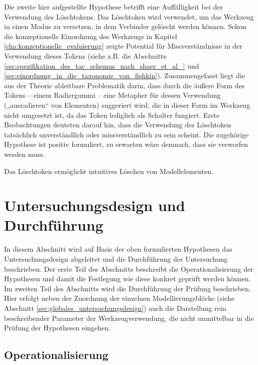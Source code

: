 Die zweite hier aufgestellte Hypothese betrifft eine Auffälligkeit bei der Verwendung des Löschtokens. Das Löschtoken wird verwendet, um das Werkzeug in einen Modus zu versetzen, in dem Verbinder gelöscht werden können. Schon die konzeptionelle Einordnung des Werkzeugs in Kapitel \ref{cha:konzeptionelle_evaluierung} zeigte Potential für Missverständnisse in der Verwendung dieses Tokens (siehe z.B. die Abschnitte \ref{sec:spezifikation_des_tac_schemas_nach_shaer_et_al_} und \ref{sec:einordnung_in_die_taxonomie_von_fishkin}). Zusammengefasst liegt die aus der Theorie ableitbare Problematik darin, dass durch die äußere Form des Tokens -- einem Radiergummi -- eine Metapher für dessen Verwendung („ausradieren“ von Elementen) suggeriert wird, die in dieser Form im Werkzeug nicht umgesetzt ist, da das Token lediglich als Schalter fungiert. Erste Beobachtungen deuteten darauf hin, dass die Verwendung des Löschtoken tatsächlich unverständlich oder missverständlich zu sein scheint. Die zugehörige Hypothese ist positiv formuliert, zu erwarten wäre demnach, dass sie verworfen werden muss.

\begin{hyp}
	\label{hyp:radierer}
	Das Löschtoken ermöglicht intuitives Löschen von Modellelementen.
\end{hyp}


\section{Untersuchungsdesign und Durchführung} %
\label{sec:untersuchungsdesign}

In diesem Abschnitt wird auf Basis der oben formulierten Hypothesen das Untersuchungsdesign abgeleitet und die Durchführung der Untersuchung beschrieben. Der erste Teil des Abschnitts beschreibt die Operationalisierung der Hypothesen und damit die Festlegung wie diese konkret geprüft werden können. Im zweiten Teil des Abschnitts wird die Durchführung der Prüfung beschrieben. Hier erfolgt neben der Zuordnung der einzelnen Modellierungsblöcke (siehe Abschnitt \ref{sec:globales_untersuchungsdesign}) auch die Darstellung rein beschreibender Parameter der Werkzeugverwendung, die nicht unmittelbar in die Prüfung der Hypothesen eingehen. 

\subsection{Operationalisierung} %
\label{sub:operationalisierung}

